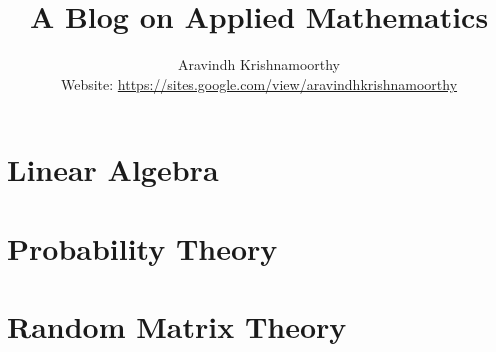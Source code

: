 \documentclass[a4paper,dvipsnames]{report}
\title{A Blog on Applied Mathematics}
\author{Aravindh Krishnamoorthy\\\small Website: \url{https://sites.google.com/view/aravindhkrishnamoorthy}}
\begin{document}
\maketitle
\tableofcontents

\chapter{Linear Algebra}






\chapter{Probability Theory}








\chapter{Random Matrix Theory}







\end{document}
